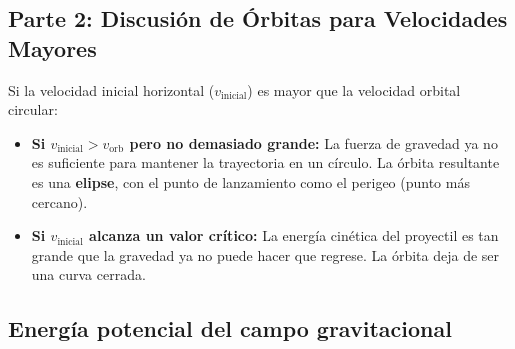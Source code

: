 \documentclass[11pt,a4paper]{book}
\begin{document}
\subsection*{Parte 2: Discusión de Órbitas para Velocidades Mayores}
Si la velocidad inicial horizontal ($v_{\text{inicial}}$) es mayor que la velocidad orbital circular:
\begin{itemize}
    \item \textbf{Si $v_{\text{inicial}} > v_{\text{orb}}$ pero no demasiado grande:} La fuerza de gravedad ya no es suficiente para mantener la trayectoria en un círculo. La órbita resultante es una \textbf{elipse}, con el punto de lanzamiento como el perigeo (punto más cercano).
    \item \textbf{Si $v_{\text{inicial}}$ alcanza un valor crítico:} La energía cinética del proyectil es tan grande que la gravedad ya no puede hacer que regrese. La órbita deja de ser una curva cerrada.
\end{itemize}




\subsection{Energía potencial del campo gravitacional}
\label{subsec:energia_potencial_gravitacional}
\end{document}
